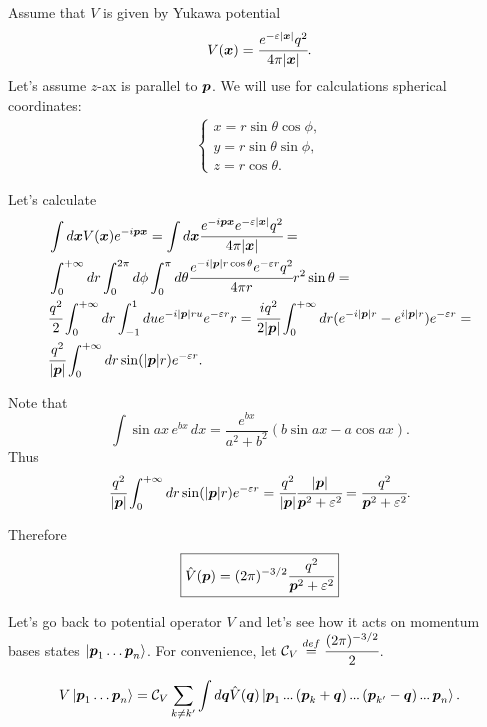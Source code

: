 \documentclass[main.tex]{subfiles}
\begin{document}
Assume that $V$ is given by Yukawa potential
\begin{equation}
V(\bs{x}) = \cfrac{e^{-\eepsilon|\bs{x}|}q^2}{4\pi |\bs{x}|}.
\end{equation}
Let's assume $z$-ax is parallel to $\boldsymbol{p}$. We will use for calculations spherical coordinates:
\begin{align*}
\begin{cases}
x = r\sin\theta \cos\phi,\\
y = r\sin\theta \sin\phi,\\
z = r\cos\theta.
\end{cases}
\end{align*}

Let's calculate
\begin{align*}
& \int d\bs{x} V(\bs{x}) e^{-i\bs{p}\bs{x}} = \int d\bs{x} \cfrac{e^{-i\bs{p}\bs{x}} e^{-\eepsilon|\bs{x}|}q^2}{4\pi |\bs{x}|} = \\
& \int_0^{+\infty} dr \int_0^{2\pi} d\phi \int_0^{\pi} d\theta
\cfrac{e^{-i|\bs{p}|r \cos\theta} e^{-\eepsilon r}q^2}{4\pi r} r^2 \sin\theta = \\
& \cfrac{q^2}{2} \int_0^{+\infty} dr \int^{1}_{-1} du 
e^{-i|\bs{p}|ru} e^{-\eepsilon r}r = \cfrac{iq^2}{2|\bs{p}|}\int_0^{+\infty} dr (e^{-i|\bs{p}|r} - e^{i|\bs{p}|r})e^{-\eepsilon r} = \\
& \cfrac{q^2}{|\bs{p}|} \int_0^{+\infty} dr \sin(|\bs{p}|r) e^{-\eepsilon r}.
\end{align*}

Note that
\begin{equation}
\int \sin ax\, e^{bx}\, dx = \frac{e^{bx}}{a^2+b^2}\left( b\sin ax - a\cos ax \right).
\end{equation}
Thus
\begin{equation}
\cfrac{q^2}{|\bs{p}|} \int_0^{+\infty} dr \sin(|\bs{p}|r) e^{-\eepsilon r} = \cfrac{q^2}{|\bs{p}|} \cfrac{|\bs{p}|}{\bs{p}^2 + \eepsilon^2} = \cfrac{q^2}{\bs{p}^2 + \eepsilon^2}.
\end{equation}

Therefore
\begin{equation}
\boxed{
\hat{V}(\bs{p}) = (2\pi)^{-3/2} \cfrac{q^2}{\bs{p}^2 + \eepsilon^2}
}
\end{equation}

Let's go back to potential operator $V$ and let's see how it acts on momentum bases states $\ket{\boldsymbol{p}_1\dots \boldsymbol{p}_n}$. For convenience, let $\mathcal{C}_V \stackrel{def}{=} \cfrac{(2\pi)^{-3/2}}{2}$.

\begin{equation}
V \ket{\bs{p}_1\dots \bs{p}_n} = \mathcal{C}_V \sum_{k\not=k'} \int d\bs{q} \hat{V}(\bs{q}) \ket{\bs{p}_1 \tdots (\bs{p}_k + \bs{q}) \tdots (\bs{p}_{k'} - \bs{q}) \tdots \bs{p}_n}.
\end{equation}
\end{document}
